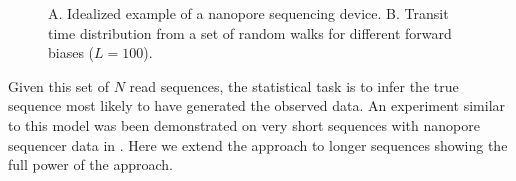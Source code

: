 \documentclass{biophys_letter}
\begin{document}
\twocolumn

\begin{figure}\vspace*{3pt}
\caption{A. Idealized example of a nanopore sequencing device. B. Transit time distribution from a set of random walks for different forward biases ($L=100$).}
\label{fig:fig1}
\end{figure}

Given this set of $N$ read sequences, the statistical task is to infer the true sequence most likely to have generated the observed data.
An experiment similar to this model was been demonstrated on very short sequences with nanopore sequencer data in \cite{Ohshiro:2012}.
Here we extend the approach to longer sequences showing the full power of the approach.
\end{document}
